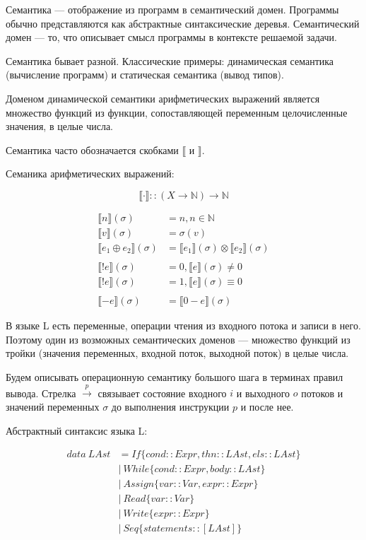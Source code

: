 \documentclass[12pt]{article}
\newcommand{\sem}[1]{\llbracket #1 \rrbracket}
\begin{document}
Семантика --- отображение из программ в семантический домен.
Программы обычно представляются как абстрактные синтаксические деревья.
Семантический домен --- то, что описывает смысл программы в контексте решаемой задачи.

Семантика бывает разной.
Классические примеры: динамическая семантика (вычисление программ) и статическая семантика (вывод типов).

Доменом динамической семантики арифметических выражений является множество функций из функции, сопоставляющей переменным целочисленные значения, в целые числа.



Семантика часто обозначается скобками $\llbracket$ и $\rrbracket$.

Семаника арифметических выражений:

$$\sem{\cdot} :: (X \rightarrow \mathbb{N}) \rightarrow \mathbb{N}$$


\begin{align*}
  \sem{n}(\sigma) &= n, n \in \mathbb{N} \\
  \sem{v}(\sigma) &= \sigma(v) \\
  \sem{e_1 \oplus e_2}(\sigma) &= \sem{e_1}(\sigma) \otimes \sem{e_2}(\sigma) \\
  & \\
  \sem{!e}(\sigma) &= 0, \sem{e}(\sigma) \neq 0 \\
  \sem{!e}(\sigma) &= 1, \sem{e}(\sigma) \equiv 0 \\ & \\
  \sem{-e}(\sigma) &= \sem{0-e}(\sigma)
\end{align*}

\bigskip

В языке L есть переменные, операции чтения из входного потока и записи в него.
Поэтому один из возможных семантических доменов --- множество функций из тройки (значения переменных, входной поток, выходной поток) в целые числа.

Будем описывать операционную семантику большого шага в терминах правил вывода.
Стрелка $\xrightarrow{p}$ связывает состояние входного $i$ и выходного $o$ потоков и значений переменных $\sigma$ до выполнения инструкции $p$ и после нее.

Абстрактный синтаксис языка L:

\begin{align*}
  data \ LAst  &= If \{ cond :: Expr, thn :: LAst, els :: LAst \} \\
               &\mid \ While \{ cond :: Expr, body :: LAst \} \\
               &\mid \ Assign \{ var :: Var, expr :: Expr \} \\
               &\mid \ Read \{ var :: Var \} \\
               &\mid \ Write \{ expr :: Expr \} \\
               &\mid \ Seq \{ statements :: [LAst] \}
\end{align*}
\end{document}
